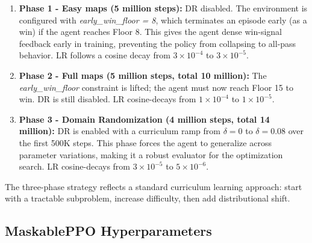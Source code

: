 \begin{enumerate}
    \item \textbf{Phase 1 - Easy maps (5 million steps):} DR disabled. The environment is configured with \textit{early\_win\_floor = 8}, which terminates an episode early (as a win) if the agent reaches Floor 8. This gives the agent dense win-signal feedback early in training, preventing the policy from collapsing to all-pass behavior. LR follows a cosine decay from $3\times10^{-4}$ to $3\times10^{-5}$.
    \item \textbf{Phase 2 - Full maps (5 million steps, total 10 million):} The \textit{early\_win\_floor} constraint is lifted; the agent must now reach Floor 15 to win. DR is still disabled. LR cosine-decays from $1\times10^{-4}$ to $1\times10^{-5}$.
    \item \textbf{Phase 3 - Domain Randomization (4 million steps, total 14 million):} DR is enabled with a curriculum ramp from $\delta=0$ to $\delta=0.08$ over the first 500K steps. This phase forces the agent to generalize across parameter variations, making it a robust evaluator for the optimization search. LR cosine-decays from $3\times10^{-5}$ to $5\times10^{-6}$.
\end{enumerate}

The three-phase strategy reflects a standard curriculum learning approach: start with a tractable subproblem, increase difficulty, then add distributional shift.

\subsection{MaskablePPO Hyperparameters}

